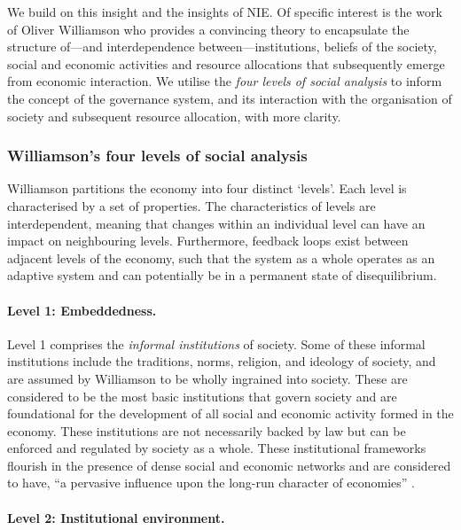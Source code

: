 We build on this insight and the insights of NIE. Of specific interest is the work of Oliver Williamson who provides a convincing theory to encapsulate the structure of---and interdependence between---institutions, beliefs of the society, social and economic activities and resource allocations that subsequently emerge from economic interaction. We utilise the \emph{four levels of social analysis} \citep{Williamson2000} to inform the concept of the governance system, and its interaction with the organisation of society and subsequent resource allocation, with more clarity.

\subsubsection{Williamson's four levels of social analysis}

Williamson partitions the economy into four distinct `levels'. Each level is characterised by a set of properties. The characteristics of levels are interdependent, meaning that changes within an individual level can have an impact on neighbouring levels. Furthermore, feedback loops exist between adjacent levels of the economy, such that the system as a whole operates as an adaptive system and can potentially be in a permanent state of disequilibrium.

\paragraph{Level 1: Embeddedness.}

Level 1 comprises the \emph{informal institutions} of society. Some of these informal institutions include the traditions, norms, religion, and ideology of society, and are assumed by Williamson to be wholly ingrained into society. These are considered to be the most basic institutions that govern society and are foundational for the development of all social and economic activity formed in the economy. These institutions are not necessarily backed by law but can be enforced and regulated by society as a whole. These institutional frameworks flourish in the presence of dense social and economic networks and are considered to have, ``a pervasive influence upon the long-run character of economies'' \citep[p.~111]{North1991b}.

\paragraph{Level 2: Institutional environment.}

